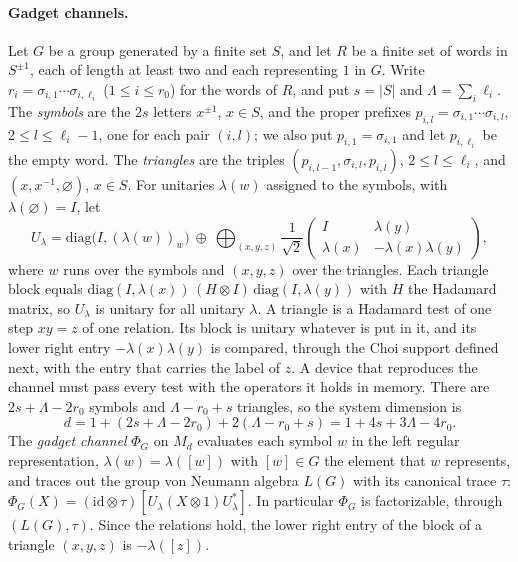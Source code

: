 

\paragraph{Gadget channels.} Let $G$ be a group generated by a finite set $S$, and let $R$ be a finite set of words in $S^{\pm1}$, each of length at
least two and each representing $1$ in $G$. Write $r_i=\sigma_{i,1}\cdots\sigma_{i,\ell_i}$ ($1\le i\le r_0$) for the words of $R$, and put
$s=|S|$ and $\Lambda=\sum_i\ell_i$. The \emph{symbols} are the $2s$ letters $x^{\pm1}$, $x\in S$, and the proper prefixes
$p_{i,l}=\sigma_{i,1}\cdots\sigma_{i,l}$, $2\le l\le\ell_i-1$, one for each pair $(i,l)$; we also put $p_{i,1}=\sigma_{i,1}$ and let $p_{i,\ell_i}$
be the empty word. The \emph{triangles} are the triples $(p_{i,l-1},\sigma_{i,l},p_{i,l})$, $2\le l\le\ell_i$, and $(x,x^{-1},\varnothing)$,
$x\in S$. For unitaries $\lambda(w)$ assigned to the symbols, with $\lambda(\varnothing)=I$, let
\[
U_\lambda=\mathrm{diag}\bigl(I,(\lambda(w))_{w}\bigr)\ \oplus\ \bigoplus_{(x,y,z)}\frac1{\sqrt2}\begin{pmatrix}I&\lambda(y)\\ \lambda(x)&-\lambda(x)\lambda(y)\end{pmatrix},
\]
where $w$ runs over the symbols and $(x,y,z)$ over the triangles. Each triangle block equals $\mathrm{diag}(I,\lambda(x))\,(H\otimes I)\,\mathrm{diag}(I,\lambda(y))$
with $H$ the Hadamard matrix, so $U_\lambda$ is unitary for all unitary $\lambda$. A triangle is a Hadamard test of one step $xy=z$ of one
relation. Its block is unitary whatever is put in it, and its lower right entry $-\lambda(x)\lambda(y)$ is compared, through the Choi support
defined next, with the entry that carries the label of $z$. A device that reproduces the channel must pass every test with the operators it
holds in memory. There are $2s+\Lambda-2r_0$ symbols and $\Lambda-r_0+s$ triangles, so the system dimension is
\begin{equation}\label{eq:gadget-dimension}
d=1+(2s+\Lambda-2r_0)+2(\Lambda-r_0+s)=1+4s+3\Lambda-4r_0 .
\end{equation}
The \emph{gadget channel} $\Phi_G$ on $M_d$ evaluates each symbol $w$ in the left regular representation, $\lambda(w)=\lambda([w])$ with $[w]\in G$ the
element that $w$ represents, and traces out the group von Neumann algebra $L(G)$ with its canonical trace $\tau$:
$\Phi_G(X)=(\mathrm{id}\otimes\tau)[U_\lambda(X\otimes1)U_\lambda^*]$. In particular $\Phi_G$ is factorizable, through $(L(G),\tau)$. Since
the relations hold, the lower right entry of the block of a triangle
$(x,y,z)$ is $-\lambda([z])$.

